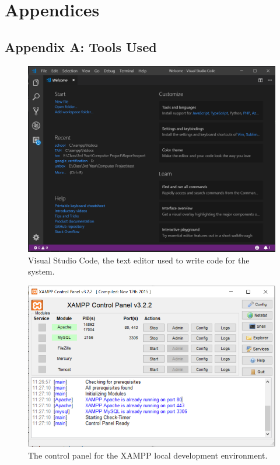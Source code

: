 \chapter{Appendices}
\section{Appendix A: Tools Used}

\begin{figure}[H]
\center
\includegraphics[scale=0.4]{images/vscode.png}
\caption{Visual Studio Code, the text editor used to write code for the system.}
\end{figure}

\begin{figure}[H]
\center
\includegraphics[scale=0.5]{images/XAMPP_cp.png}
\caption{The control panel for the XAMPP local development environment.}
\end{figure}

